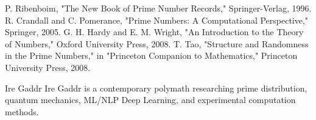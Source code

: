 \documentclass[conference]{IEEEtran}
\begin{document}
\begin{thebibliography}{00}
 P. Ribenboim, "The New Book of Prime Number Records," Springer-Verlag, 1996.
 R. Crandall and C. Pomerance, "Prime Numbers: A Computational Perspective," Springer, 2005.
 G. H. Hardy and E. M. Wright, "An Introduction to the Theory of Numbers," Oxford University Press, 2008.
 T. Tao, "Structure and Randomness in the Prime Numbers," in "Princeton Companion to Mathematics," Princeton University Press, 2008.
\end{thebibliography}

\begin{IEEEbiography}{Ire Gaddr}
Ire Gaddr is a contemporary polymath researching prime distribution, quantum mechanics, ML/NLP Deep Learning, and experimental computation methods. 
\end{IEEEbiography}
\end{document}
